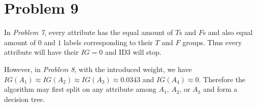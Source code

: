\documentclass[12pt]{article}
\begin{document}
\section{Problem 9}

In \textit{Problem 7}, every attribute has the equal amount of $T$s and $F$s and also equal amount of $0$ and $1$ labels corresponding to their $T$ and $F$ groups. Thus every attribute will have their $IG = 0$ and ID3 will stop.\newline

However, in \textit{Problem 8}, with the introduced weight, we have $IG(A_1) \approx IG(A_2) \approx IG(A_3) \approx 0.0343$ and $IG(A_4) \approx 0$. Therefore the algorithm may first split on any attribute among $A_1$, $A_2$, or $A_3$ and form a decision tree.



% 
% 
\end{document}
